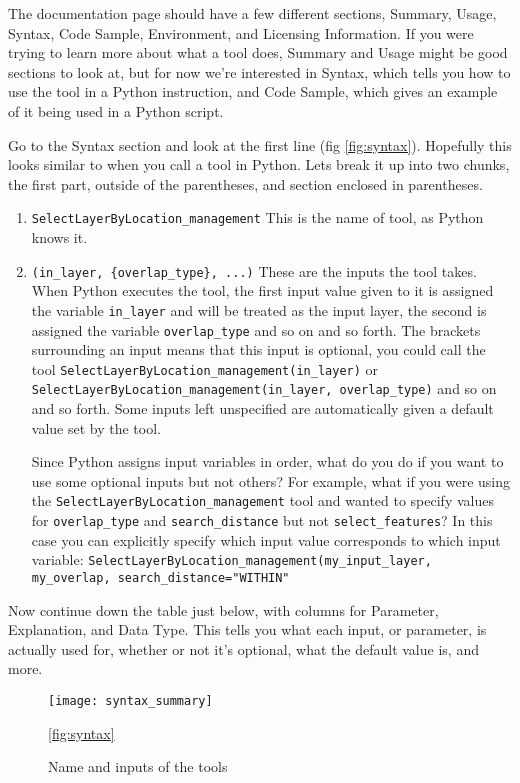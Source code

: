 \documentclass{article}
\begin{document}
\begin{enumerate}
\begin{itemize}
{The documentation page should have a few different sections, Summary, Usage, Syntax, Code Sample, Environment, and Licensing Information.  If you were trying to learn more about what a tool does, Summary and Usage might be good sections to look at, but for now we're interested in Syntax, which tells you how to use the tool in a Python instruction, and Code Sample, which gives an example of it being used in a Python script.

Go to the Syntax section and look at the first line (fig \ref{fig:syntax}).  Hopefully this looks similar to when you call a tool in Python.  Lets break it up into two chunks, the first part, outside of the parentheses, and section enclosed in parentheses.
\begin{enumerate}
    \item \verb+SelectLayerByLocation_management+ This is the name of tool, as Python knows it. 
    \item \verb+(in_layer, {overlap_type}, ...)+ These are the inputs the tool takes.  When Python executes the tool, the first input value given to it is assigned the variable \verb+in_layer+ and will be treated as the input layer, the second is assigned the variable \verb+overlap_type+ and so on and so forth.  The brackets surrounding an input means that this input is optional, you could call the tool \verb+SelectLayerByLocation_management(in_layer)+ or \verb+SelectLayerByLocation_management(in_layer, overlap_type)+ and so on and so forth.  Some inputs left unspecified are automatically given a default value set by the tool.

    Since Python assigns input variables in order, what do you do if you want to use some optional inputs but not others?  For example, what if you were using the \verb+SelectLayerByLocation_management+ tool and wanted to specify values for \verb+overlap_type+ and \verb+search_distance+ but not \verb+select_features+?  In this case you can explicitly specify which input value corresponds to which input variable: \verb+SelectLayerByLocation_management(my_input_layer, my_overlap, search_distance="WITHIN"+
\end{enumerate}

Now continue down the table just below, with columns for Parameter, Explanation, and Data Type.  This tells you what each input, or parameter,  is actually used for, whether or not it's optional, what the default value is, and more.

\begin{figure}
    \texttt{[image: syntax\_summary]}
    \caption{Name and inputs of the tools}
    \ref{fig:syntax}
\end{figure}

}
\end{itemize}
\end{enumerate}
\end{document}
